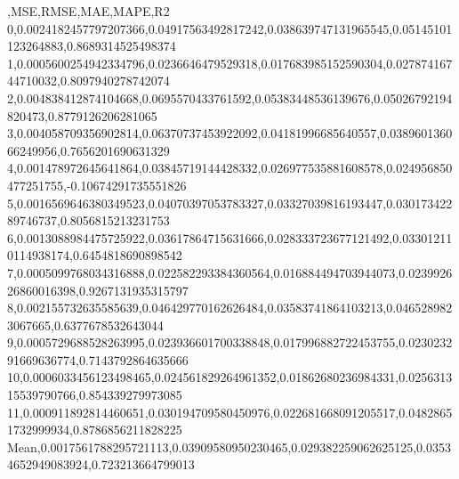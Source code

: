 ,MSE,RMSE,MAE,MAPE,R2
0,0.0024182457797207366,0.04917563492817242,0.038639747131965545,0.05145101123264883,0.8689314525498374
1,0.0005600254942334796,0.0236646479529318,0.017683985152590304,0.02787416744710032,0.8097940278742074
2,0.004838412874104668,0.0695570433761592,0.05383448536139676,0.05026792194820473,0.8779126206281065
3,0.004058709356902814,0.06370737453922092,0.04181996685640557,0.038960136066249956,0.7656201690631329
4,0.001478972645641864,0.03845719144428332,0.026977535881608578,0.024956850477251755,-0.10674291735551826
5,0.0016569646380349523,0.04070397053783327,0.03327039816193447,0.03017342289746737,0.8056815213231753
6,0.0013088984475725922,0.03617864715631666,0.028333723677121492,0.033012110114938174,0.6454818690898542
7,0.0005099768034316888,0.022582293384360564,0.016884494703944073,0.023992626860016398,0.9267131935315797
8,0.002155732635585639,0.046429770162626484,0.03583741864103213,0.0465289823067665,0.6377678532643044
9,0.0005729688528263995,0.023936601700338848,0.017996882722453755,0.023023291669636774,0.7143792864635666
10,0.0006033456123498465,0.024561829264961352,0.01862680236984331,0.025631315539790766,0.854339279973085
11,0.000911892814460651,0.030194709580450976,0.022681668091205517,0.04828651732999934,0.8786856211828225
Mean,0.0017561788295721113,0.03909580950230465,0.029382259062625125,0.03534652949083924,0.723213664799013
